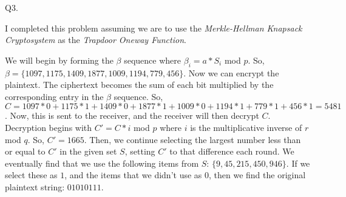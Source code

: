 \documentclass[11pt]{article}
\newcommand{\gap}{\vspace{3mm}}
\begin{document}
Q3.

\gap{}

I completed this problem assuming we are to use the \textit{Merkle-Hellman Knapsack Cryptosystem} as the \textit{Trapdoor Oneway Function}.

\gap{}

We will begin by forming the $\beta$ sequence where $\beta_i=a*S_i$ mod $p$. So, \\
$\beta=\{1097, 1175, 1409, 1877, 1009, 1194, 779, 456\}$. Now we can encrypt the plaintext. The ciphertext becomes the sum of each bit multiplied by the corresponding entry in the $\beta$ sequence. So, $C=1097 * 0 + 1175 * 1 + 1409 * 0 + 1877 * 1 + 1009 * 0 + 1194 * 1+ 779 * 1 + 456 * 1=5481$. Now, this is sent to the receiver, and the receiver will then decrypt $C$. Decryption begins with $C'=C*i$ mod $p$ where $i$ is the multiplicative inverse of $r$ mod $q$. So, $C'=1665$. Then, we continue selecting the largest number less than or equal to $C'$ in the given set $S$, setting $C'$ to that difference each round. We eventually find that we use the following items from $S$: $\{9, 45, 215, 450, 946\}$. If we select these as $1$, and the items that we didn't use as $0$, then we find the original plaintext string: $0101 0111$.
\end{document}
